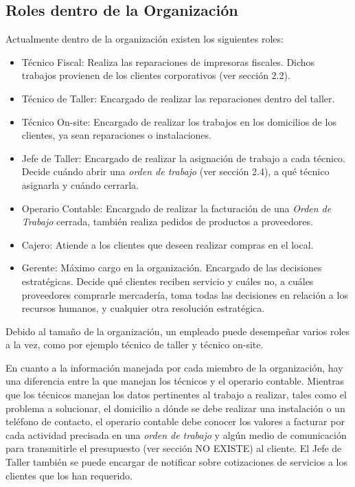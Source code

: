 \documentclass[12pt]{extarticle}
\begin{document}
\begin{spacing}{1.2}
    \subsection{Roles dentro de la Organización}
    Actualmente dentro de la organización existen los siguientes roles:
    \begin{itemize}
        \item Técnico Fiscal: Realiza las reparaciones de impresoras fiscales. Dichos trabajos provienen de los clientes corporativos (ver sección 2.2).
        \item Técnico de Taller: Encargado de realizar las reparaciones dentro del taller.
        \item Técnico On-site: Encargado de realizar los trabajos en los domicilios de los clientes, ya sean reparaciones o instalaciones.
        \item Jefe de Taller: Encargado de realizar la asignación de trabajo a cada técnico. Decide cuándo abrir una \textit{orden de trabajo} (ver sección 2.4), a qué técnico asignarla y cuándo cerrarla.
        \item Operario Contable: Encargado de realizar la facturación de una \textit{Orden de Trabajo} cerrada, también realiza pedidos de productos a proveedores.
        \item Cajero: Atiende a los clientes que deseen realizar compras en el local.
        \item Gerente: Máximo cargo en la organización. Encargado de las decisiones estratégicas. Decide qué clientes reciben servicio y cuáles no, a cuáles proveedores comprarle mercadería, toma todas las decisiones en relación a los recursos humanos, y cualquier otra resolución estratégica.  
    \end{itemize}
    

    Debido al tamaño de la organización, un empleado puede desempeñar varios roles a la vez, como por ejemplo técnico de taller y técnico on-site.  

    En cuanto a la información manejada por cada miembro de la organización, hay una diferencia entre la que manejan los técnicos y el operario contable. Mientras que los técnicos manejan los datos pertinentes al trabajo a realizar, tales como el problema a solucionar, el domicilio a dónde se debe realizar una instalación o un teléfono de contacto, el operario contable debe conocer los valores a facturar por cada actividad precisada en una \textit{orden de trabajo} y algún medio de comunicación para transmitirle el presupuesto (ver sección NO EXISTE) al cliente. El Jefe de Taller también se puede encargar de notificar sobre cotizaciones de servicios a los clientes que los han requerido.


\end{spacing}
\end{document}
